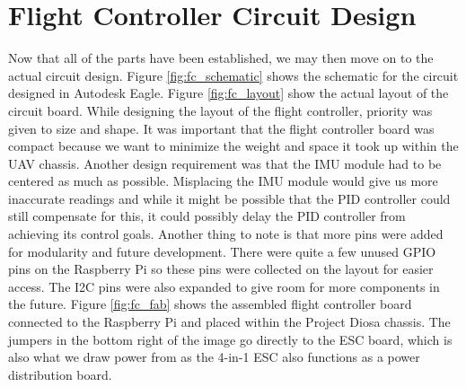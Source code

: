 \documentclass[english]{upeeei}
\begin{document}
\section{Flight Controller Circuit Design}
Now that all of the parts have been established, we may then move on to the actual circuit design. Figure \ref{fig:fc_schematic} shows the
schematic for the circuit designed in Autodesk Eagle. Figure \ref{fig:fc_layout} show the actual layout of the circuit board. While designing
the layout of the flight controller, priority was given to size and shape. It was important that the flight controller board was compact because
we want to minimize the weight and space it took up within the UAV chassis. Another design requirement was that the IMU module had to be centered
as much as possible. Misplacing the IMU module would give us more inaccurate readings and while it might be possible that the PID controller
could still compensate for this, it could possibly delay the PID controller from achieving its control goals. Another thing to note is that
more pins were added for modularity and future development. There were quite a few unused GPIO pins on the Raspberry Pi so these pins were
collected on the layout for easier access. The I2C pins were also expanded to give room for more components in the future. Figure \ref{fig:fc_fab}
shows the assembled flight controller board connected to the Raspberry Pi and placed within the Project Diosa chassis. The jumpers in the bottom
right of the image go directly to the ESC board, which is also what we draw power from as the 4-in-1 ESC also functions as a power distribution board.
\end{document}
